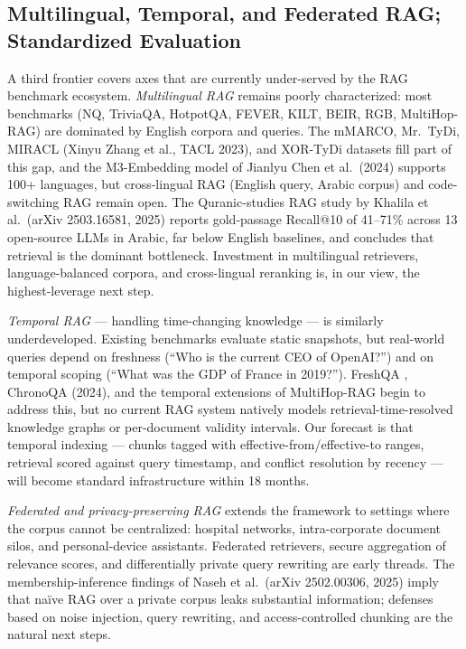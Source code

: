 \documentclass{article}
\begin{document}
\subsection{Multilingual, Temporal, and Federated RAG; Standardized Evaluation}\label{multilingual-temporal-and-federated-rag-standardized-evaluation}

A third frontier covers axes that are currently under-served by the RAG benchmark ecosystem. \emph{Multilingual RAG} remains poorly characterized: most benchmarks (NQ, TriviaQA, HotpotQA, FEVER, KILT, BEIR, RGB, MultiHop-RAG) are dominated by English corpora and queries. The mMARCO, Mr.~TyDi, MIRACL (Xinyu Zhang et al., TACL 2023), and XOR-TyDi datasets fill part of this gap, and the M3-Embedding model of Jianlyu Chen et al.~(2024) supports 100+ languages, but cross-lingual RAG (English query, Arabic corpus) and code-switching RAG remain open. The Quranic-studies RAG study by Khalila et al.~(arXiv 2503.16581, 2025) reports gold-passage Recall@10 of 41--71\% across 13 open-source LLMs in Arabic, far below English baselines, and concludes that retrieval is the dominant bottleneck. Investment in multilingual retrievers, language-balanced corpora, and cross-lingual reranking is, in our view, the highest-leverage next step.

\emph{Temporal RAG} --- handling time-changing knowledge --- is similarly underdeveloped. Existing benchmarks evaluate static snapshots, but real-world queries depend on freshness (``Who is the current CEO of OpenAI?'') and on temporal scoping (``What was the GDP of France in 2019?''). FreshQA \citep{vu2023freshqarefreshingl}, ChronoQA (2024), and the temporal extensions of MultiHop-RAG begin to address this, but no current RAG system natively models retrieval-time-resolved knowledge graphs or per-document validity intervals. Our forecast is that temporal indexing --- chunks tagged with effective-from/effective-to ranges, retrieval scored against query timestamp, and conflict resolution by recency --- will become standard infrastructure within 18 months.

\emph{Federated and privacy-preserving RAG} extends the framework to settings where the corpus cannot be centralized: hospital networks, intra-corporate document silos, and personal-device assistants. Federated retrievers, secure aggregation of relevance scores, and differentially private query rewriting are early threads. The membership-inference findings of Naseh et al.~(arXiv 2502.00306, 2025) imply that naïve RAG over a private corpus leaks substantial information; defenses based on noise injection, query rewriting, and access-controlled chunking are the natural next steps.
\end{document}
